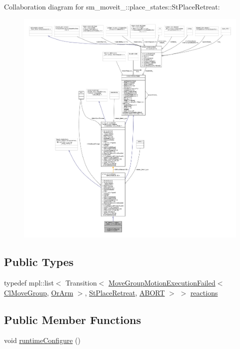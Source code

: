 Collaboration diagram for sm\+\_\+moveit\+\_\+:\+:place\+\_\+states\+:\+:St\+Place\+Retreat\+:
\nopagebreak
\begin{figure}[H]
\begin{center}
\leavevmode
\includegraphics[width=350pt]{structsm__moveit__2_1_1place__states_1_1StPlaceRetreat__coll__graph}
\end{center}
\end{figure}
\subsection*{Public Types}
\begin{DoxyCompactItemize}
\item 
typedef mpl\+::list$<$ Transition$<$ \hyperlink{structmoveit__z__client_1_1MoveGroupMotionExecutionFailed}{Move\+Group\+Motion\+Execution\+Failed}$<$ \hyperlink{classmoveit__z__client_1_1ClMoveGroup}{Cl\+Move\+Group}, \hyperlink{classsm__moveit__2_1_1OrArm}{Or\+Arm} $>$, \hyperlink{structsm__moveit__2_1_1place__states_1_1StPlaceRetreat}{St\+Place\+Retreat}, \hyperlink{classABORT}{A\+B\+O\+RT} $>$ $>$ \hyperlink{structsm__moveit__2_1_1place__states_1_1StPlaceRetreat_ae900e0e40af9539ce4b2c10454dde207}{reactions}
\end{DoxyCompactItemize}
\subsection*{Public Member Functions}
\begin{DoxyCompactItemize}
\item 
void \hyperlink{structsm__moveit__2_1_1place__states_1_1StPlaceRetreat_ab3c8e46bce1643ab6ecd415ecf1af6f6}{runtime\+Configure} ()
\end{DoxyCompactItemize}
